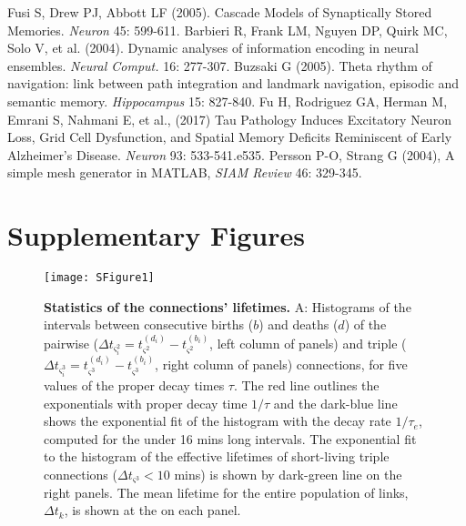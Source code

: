 \documentclass[12pt,tightenlines]{revtex4}
\newcommand{\beginsupplement}{
        \setcounter{table}{0}
        \renewcommand{\thetable}{S\arabic{table}}
        \setcounter{figure}{0}
        \renewcommand{\thefigure}{S\arabic{figure}}
     }
\begin{document}
\begin{thebibliography}{99}
 Fusi S, Drew PJ, Abbott LF (2005). Cascade Models of Synaptically Stored Memories. \emph{Neuron} 45: 599-611.
 Barbieri R, Frank LM, Nguyen DP, Quirk MC, Solo V, et al. (2004). Dynamic analyses of information encoding in neural ensembles. \emph{Neural Comput.} 16: 277-307.
 Buzsaki G (2005). Theta rhythm of navigation: link between path integration and landmark navigation, episodic and semantic memory. \emph{Hippocampus} 15: 827-840.
 Fu H, Rodriguez GA, Herman M, Emrani S, Nahmani E, et al., (2017) Tau Pathology Induces Excitatory Neuron Loss, Grid Cell Dysfunction, and Spatial Memory Deficits Reminiscent of Early Alzheimer's Disease. \emph{Neuron} 93: 533-541.e535.
 Persson P-O, Strang G (2004), A simple mesh generator in MATLAB, \emph{SIAM Review} 46: 329-345.
\end{thebibliography}
\newpage
\beginsupplement

\section{Supplementary Figures}

\begin{figure}[ht]
\texttt{[image: SFigure1]}
\caption{{\footnotesize \textbf{Statistics of the connections' lifetimes.} A: Histograms of the intervals between consecutive 
births ($b$) and deaths ($d$) of the pairwise ($\Delta t_{\varsigma^2_i} = t^{(d_i)}_{\varsigma^2} - t^{(b_i)}_{\varsigma^2}$, 
left column of panels) and triple ($\Delta t_{\varsigma^3_i} = t^{(d_i)}_{\varsigma^3} - t^{(b_i)}_{\varsigma^3}$, right column 
of panels) connections, for five values of the proper decay times $\tau$. The red line outlines the exponentials with proper decay 
time $1/\tau$ and the dark-blue line shows the exponential fit of the histogram with the decay rate $1/\tau_{e}$, computed for the 
under 16 mins long intervals. The exponential fit to the histogram of the effective lifetimes of short-living triple connections 
($\Delta t_{\varsigma^3} < 10$ mins) is shown by dark-green line on the right panels. The mean lifetime for the entire population 
of links, $\Delta t_{k}$, is shown at the on each panel.}}
\label{SFigure1}
\end{figure} 
\end{document}
